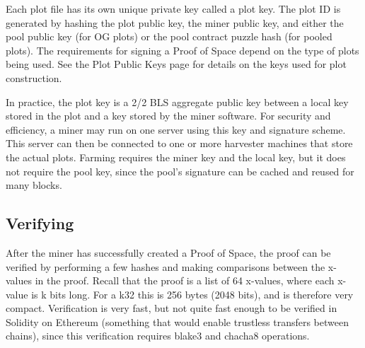 \begin{flushleft}
    Each plot file has its own unique private key called a plot key. The plot ID is generated by hashing the plot public key, the miner public key, and either the pool public key (for OG plots) or the pool contract puzzle hash (for pooled plots). The requirements for signing a Proof of Space depend on the type of plots being used. See the Plot Public Keys page for details on the keys used for plot construction.
\end{flushleft}
\begin{flushleft}
    In practice, the plot key is a 2/2 BLS aggregate public key between a local key stored in the plot and a key stored by the miner software. For security and efficiency, a miner may run on one server using this key and signature scheme. This server can then be connected to one or more harvester machines that store the actual plots. Farming requires the miner key and the local key, but it does not require the pool key, since the pool's signature can be cached and reused for many blocks.
\end{flushleft}
\subsection{Verifying}
\begin{flushleft}
    After the miner has successfully created a Proof of Space, the proof can be verified by performing a few hashes and making comparisons between the x-values in the proof. Recall that the proof is a list of 64 x-values, where each x-value is k bits long. For a k32 this is 256 bytes (2048 bits), and is therefore very compact. Verification is very fast, but not quite fast enough to be verified in Solidity on Ethereum (something that would enable trustless transfers between chains), since this verification requires blake3 and chacha8 operations.
\end{flushleft}
